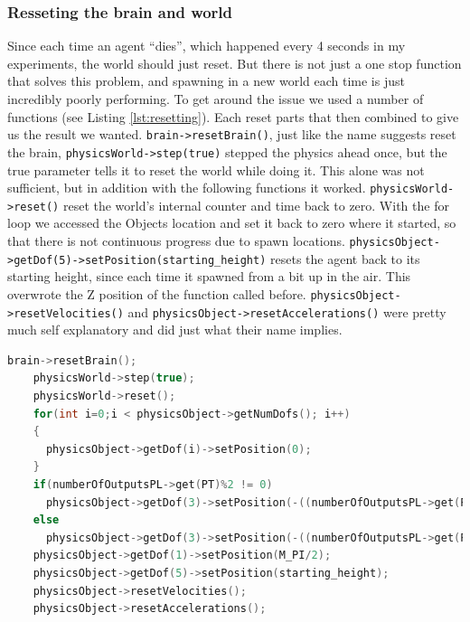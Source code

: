 \documentclass[12pt,oneside,listof=totoc,paper=a4,headings=small]{scrbook}
\begin{document}
\subsubsection{Resseting the brain and world}
Since each time an agent ``dies'', which happened every 4 seconds in my experiments, the world should just reset. But there is not just a one stop function that solves this problem, and spawning in a new world each time is just incredibly poorly performing. To get around the issue we used a number of functions (see Listing \ref{lst:resetting}). Each reset parts that then combined to give us the result we wanted. \lstinline{brain->resetBrain()}, just like the name suggests reset the brain, \lstinline{physicsWorld->step(true)} stepped the physics ahead once, but the true parameter tells it to reset the world while doing it. This alone was not sufficient, but in addition with the following functions it worked. \lstinline{physicsWorld->reset()} reset the world's internal counter and time back to zero. With the for loop we accessed the Objects location and set it back to zero where it started, so that there is not continuous progress due to spawn locations. \newline \lstinline{physicsObject->getDof(5)->setPosition(starting_height)} resets the agent back to its starting height, since each time it spawned from a bit up in the air. This overwrote the Z position of the function called before.
\lstinline{physicsObject->resetVelocities()} and \lstinline{physicsObject->resetAccelerations()} were pretty much self explanatory and did just what their name implies.
\begin{lstlisting}[language=C++, label={lst:resetting}, caption=Resetting world and brain]
    brain->resetBrain();
    physicsWorld->step(true);
    physicsWorld->reset(); 
    for(int i=0;i < physicsObject->getNumDofs(); i++)
    {
      physicsObject->getDof(i)->setPosition(0);
    }
    if(numberOfOutputsPL->get(PT)%2 != 0)
      physicsObject->getDof(3)->setPosition(-((numberOfOutputsPL->get(PT)/2)*((jointLengthPL->get(PT)+default_width))));
    else
      physicsObject->getDof(3)->setPosition(-((numberOfOutputsPL->get(PT)/2)*((jointLengthPL->get(PT)+default_width)))+((jointLengthPL->get(PT)+default_width)*0.5));
    physicsObject->getDof(1)->setPosition(M_PI/2);
    physicsObject->getDof(5)->setPosition(starting_height);
    physicsObject->resetVelocities();
    physicsObject->resetAccelerations();
\end{lstlisting}

\newpage
\end{document}
